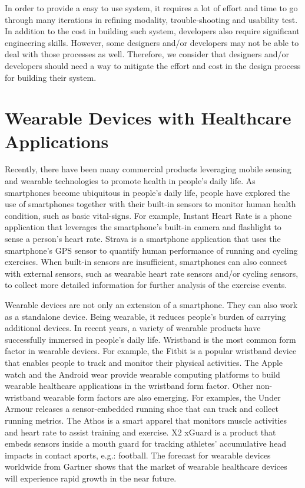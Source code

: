 In order to provide a easy to use system, it requires a lot of effort and time to go through many iterations in refining modality, trouble-shooting and usability test.
In addition to the cost in building such system, developers also require significant engineering skills. However, some designers and/or developers may not be able to deal with those processes as well. Therefore, we consider that designers and/or developers should need a way to mitigate the effort and cost in the design process for building their system.

\section{Wearable Devices with Healthcare Applications}
Recently, there have been many commercial products leveraging mobile sensing and wearable technologies to promote health in people's daily life. As smartphones become ubiquitous in people's daily life, people have explored the use of smartphones together with their built-in sensors to monitor human health condition, such as basic vital-signs. For example, Instant Heart Rate \cite{Instant_Heart_Rate} is a phone application that leverages the smartphone's built-in camera and flashlight to sense a person's heart rate. Strava \cite{Strava} is a smartphone application that uses the smartphone's GPS sensor to quantify human performance of running and cycling exercises. When built-in sensors are insufficient, smartphones can also connect with external sensors, such as wearable heart rate sensors and/or cycling sensors, to collect more detailed information for further analysis of the exercise events.

Wearable devices are not only an extension of a smartphone. They can also work as a standalone device. Being wearable, it reduces people's burden of carrying additional devices. In recent years, a variety of wearable products have successfully immersed in people's daily life. Wristband is the most common form factor in wearable devices. For example, the Fitbit \cite{Fitbit} is a popular wristband device that enables people to track and monitor their physical activities. The Apple watch \cite{Apple_watch} and the Android wear \cite{Android_wear} provide wearable computing platforms to build wearable healthcare applications in the wristband form factor. Other non-wristband wearable form factors are also emerging. For examples, the Under Armour \cite{Under_armour} releases a sensor-embedded running shoe that can track and collect running metrics. The Athos \cite{Athos} is a smart apparel that monitors muscle activities and heart rate to assist training and exercise. X2 xGuard \cite{X2_xGuard, camarillo2013head} is a product that embeds sensors inside a mouth guard for tracking athletes' accumulative head impacts in contact sports, e.g.: football. The forecast for wearable devices worldwide from Gartner \cite{gartner2016wearable} shows that the market of wearable healthcare devices will experience rapid growth in the near future. 

